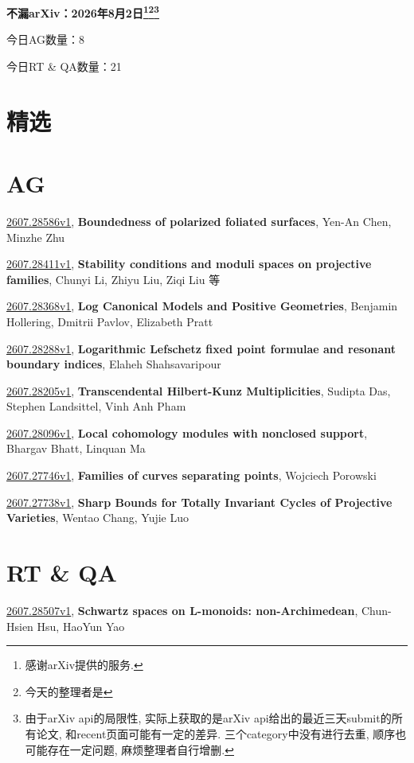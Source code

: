 \documentclass[9pt, a4paper]{article}
\theoremstyle{plain}
\theoremstyle{definition}
\theoremstyle{remark}
\newcommand{\arxiv}[3]{\href{https://arxiv.org/abs/#1}{#1}, \textbf{\textcolor{arxivblue}{#2}}, #3}
\newcommand{\AGnumber}{8}
\newcommand{\RTQAnumber}{21}
\newcommand{\NewestDate}{2026年8月2日}
\newcommand{\todayarXiver}{} %
\begin{document}
\begin{center}
    \Huge\textbf{不漏arXiv：\NewestDate\footnote{感谢arXiv提供的服务.}\footnote{今天的整理者是\todayarXiver}\footnote{由于arXiv api的局限性, 实际上获取的是arXiv api给出的最近三天submit的所有论文, 和recent页面可能有一定的差异. 三个category中没有进行去重, 顺序也可能存在一定问题, 麻烦整理者自行增删.}} \\
\end{center}

\setcounter{section}{-1}

\begin{center}
    今日AG数量：\AGnumber
    
    今日RT \& QA数量：\RTQAnumber
    
\end{center}


\section{精选}


\section{AG}
\arxiv{2607.28586v1}{Boundedness of polarized foliated surfaces}{Yen-An Chen, Minzhe Zhu}

\arxiv{2607.28411v1}{Stability conditions and moduli spaces on projective families}{Chunyi Li, Zhiyu Liu, Ziqi Liu 等}

\arxiv{2607.28368v1}{Log Canonical Models and Positive Geometries}{Benjamin Hollering, Dmitrii Pavlov, Elizabeth Pratt}

\arxiv{2607.28288v1}{Logarithmic Lefschetz fixed point formulae and resonant boundary indices}{Elaheh Shahsavaripour}

\arxiv{2607.28205v1}{Transcendental Hilbert-Kunz Multiplicities}{Sudipta Das, Stephen Landsittel, Vinh Anh Pham}

\arxiv{2607.28096v1}{Local cohomology modules with nonclosed support}{Bhargav Bhatt, Linquan Ma}

\arxiv{2607.27746v1}{Families of curves separating points}{Wojciech Porowski}

\arxiv{2607.27738v1}{Sharp Bounds for Totally Invariant Cycles of Projective Varieties}{Wentao Chang, Yujie Luo}


\section{RT \& QA}
\arxiv{2607.28507v1}{Schwartz spaces on L-monoids: non-Archimedean}{Chun-Hsien Hsu, HaoYun Yao}
\end{document}

